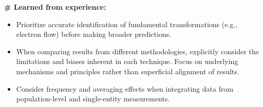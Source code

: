 \documentclass{article} %
\begin{document}
\begin{tcolorbox}[
    colback=gray!5, %
    colframe=gray!75, %
    fonttitle=\bfseries,
    title=Specialist Prompt: \textsc{CoT\_Physics},
    arc=2mm, %
    boxrule=1pt,
    breakable
]
\vspace{1em}
\textbf{\# Learned from experience:}
\begin{itemize}
    \itemsep0.5em
    \item Prioritize accurate identification of fundamental transformations (e.g., electron flow) before making broader predictions.
    \item When comparing results from different methodologies, explicitly consider the limitations and biases inherent in each technique. Focus on underlying mechanisms and principles rather than superficial alignment of results.
    \item Consider frequency and averaging effects when integrating data from population-level and single-entity measurements.
\end{itemize}
\end{tcolorbox}
\end{document}
